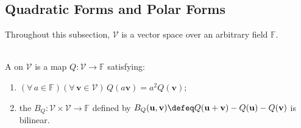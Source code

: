 \subsection{Quadratic Forms and Polar Forms}

Throughout this subsection, $\mathcal{V}$ is a vector space over an arbitrary field $\mathbb{F}$.

\begin{definition} \label{def:quadratic-form-and-polar-form} \\
A  on $\mathcal{V}$ is a map $Q:\mathcal{V}\to\mathbb{F}$ satisfying:
\begin{enumerate}[label=(\roman*)]
\setlength{\itemsep}{0pt}
\item $(\forall\,a\in\mathbb{F})(\forall\,\mathbf{v}\in\mathcal{V})\,Q(a\mathbf{v})=a^2Q(\mathbf{v})$;
\item the  $B_Q:\mathcal{V}\times\mathcal{V}\to\mathbb{F}$ defined by $B_Q(\mathbf{u},\mathbf{v})\defeq Q(\mathbf{u}+\mathbf{v})-Q(\mathbf{u})-Q(\mathbf{v})$ is bilinear.
\end{enumerate}
\end{definition}

